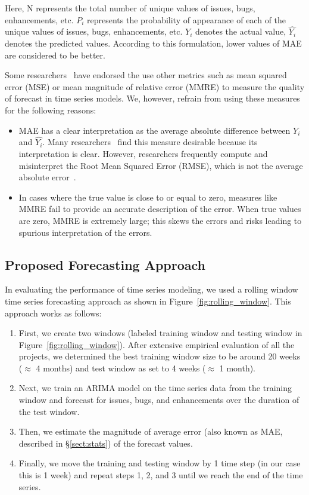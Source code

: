 \documentclass[sigconf, preprint]{acmart}
\newcommand{\bi}{\begin{itemize}}%
\newcommand{\ei}{\end{itemize}}
\newcommand{\be}{\begin{enumerate}}
\newcommand{\ee}{\end{enumerate}}
\newcommand{\tion}[1]{\S\ref{sect:#1}}
\newcommand{\fig}[1]{Figure~\ref{fig:#1}}
\begin{document}
Here, N represents the total number of unique values of issues, bugs, enhancements, etc. $P_i$ represents the probability of appearance of each of the unique values of issues, bugs, enhancements, etc. $Y_i$ denotes the actual value, $\hat{Y_i}$ denotes the predicted values. According to this formulation, lower values of MAE are considered to be better. 

Some researchers~\cite{amin2013approach} have endorsed the use other metrics 
such as mean squared error (MSE) or mean magnitude of relative error (MMRE) to 
measure the quality of forecast in time series models. We, however, refrain 
from using these measures for the following reasons:

\bi
\item MAE has a clear interpretation as the average absolute difference between $Y_i$ and $\hat{Y_i}$. Many researchers~\cite{willmott2005advantages,willmott2006use} find this measure desirable because its interpretation is clear. However, researchers frequently compute and misinterpret the Root Mean Squared Error (RMSE), which is not the average absolute error~\cite{willmott2005advantages,willmott2006use}.
\item In cases where the true value is close to or equal to zero, measures like 
MMRE fail to provide an accurate description of the error. When true values are 
zero, MMRE is extremely large; this skews the errors and risks leading to 
spurious interpretation of the errors. 
\ei



\subsection{Proposed Forecasting Approach}
\label{sect:approach}
In evaluating the performance of time series modeling, we used a rolling 
window time series forecasting approach as shown in \fig{rolling_window}. This 
approach works as follows:
\be
\item First, we create two windows (labeled training window and testing window 
in \fig{rolling_window}). After extensive empirical evaluation of all the 
projects, we determined the best training window size to be around 20 weeks 
($\approx$ 4 months) and test window as set to 4 weeks ($\approx$ 1 month).
\item Next, we train an ARIMA model on the time series data from the training 
window and forecast for issues, bugs, and enhancements over the duration of the 
test window.
\item Then, we estimate the magnitude of average error (also known as MAE, 
described in \tion{stats}) of the forecast values.
\item Finally, we move the training and testing window by 1 time step (in our 
case this is 1 week) and repeat steps 1, 2, and 3 until we reach the end of the 
time series.
\ee
\end{document}
